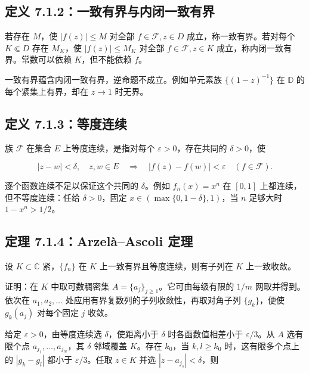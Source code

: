 \documentclass[11pt,a4paper]{article}
\begin{document}
\subsection{定义 7.1.2：一致有界与内闭一致有界}\label{ch07-s1-heading-3}

若存在 \(M\)，使 \(|f(z)|\le M\) 对全部 \(f\in\mathcal F,z\in D\)
成立，称一致有界。若对每个 \(K\Subset D\) 存在 \(M_K\)，使
\(|f(z)|\le M_K\) 对全部 \(f\in\mathcal F,z\in K\)
成立，称内闭一致有界。常数可以依赖 \(K\)，但不能依赖 \(f\)。

一致有界蕴含内闭一致有界，逆命题不成立。例如单元素族 \(\{(1-z)^{-1}\}\)
在 \(\mathbb D\) 的每个紧集上有界，却在 \(z\to1\) 时无界。

\subsection{定义 7.1.3：等度连续}\label{ch07-s1-heading-4}

族 \(\mathcal F\) 在集合 \(E\) 上等度连续，是指对每个
\(\varepsilon>0\)，存在共同的 \(\delta>0\)，使

\[
|z-w|<\delta,\quad z,w\in E
\quad\Longrightarrow\quad |f(z)-f(w)|<\varepsilon\quad(f\in\mathcal F).
\]

逐个函数连续不足以保证这个共同的 \(\delta\)。例如 \(f_n(x)=x^n\) 在
\([0,1]\) 上都连续，但不等度连续：任给 \(\delta>0\)，固定
\(x\in(\max\{0,1-\delta\},1)\)，当 \(n\) 足够大时 \(1-x^n>1/2\)。

\subsection{定理 7.1.4：Arzelà--Ascoli 定理}\label{ch07-s1-heading-5}

设 \(K\subset\mathbb C\) 紧，\(\{f_n\}\) 在 \(K\)
上一致有界且等度连续，则有子列在 \(K\) 上一致收敛。

证明：在 \(K\) 中取可数稠密集 \(A=\{a_j\}_{j\ge1}\)。它可由每级有限的
\(1/m\) 网取并得到。依次在 \(a_1,a_2,\ldots\)
处应用有界复数列的子列收敛性，再取对角子列 \(\{g_k\}\)，便使
\(g_k(a_j)\) 对每个固定 \(j\) 收敛。

给定 \(\varepsilon>0\)，由等度连续选 \(\delta\)，使距离小于 \(\delta\)
时各函数值相差小于 \(\varepsilon/3\)。从 \(A\) 选有限个点
\(a_{j_1},\ldots,a_{j_N}\)，其 \(\delta\) 邻域覆盖 \(K\)。存在
\(k_0\)，当 \(k,l\ge k_0\) 时，这有限多个点上的 \(|g_k-g_l|\) 都小于
\(\varepsilon/3\)。任取 \(z\in K\) 并选 \(|z-a_{j_s}|<\delta\)，则
\end{document}
